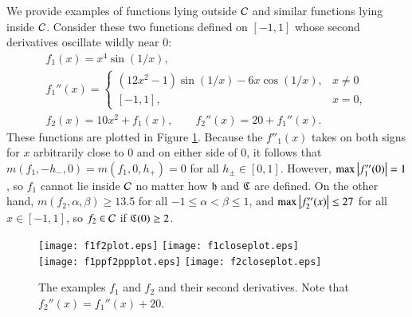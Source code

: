 \documentclass[review]{elsarticle}
\theoremstyle{definition}
\begin{document}
We provide examples of functions lying outside $\mathcal{C}$
and similar functions lying inside $\mathcal{C}$. Consider these two functions defined
on $[-1,1]$ whose second derivatives oscillate wildly near $0$:
\begin{gather*}
f_1(x) = x^4 \sin(1/x), \\
 f_1''(x) = \begin{cases} (12x^2 - 1) \sin(1/x) -6 x \cos(1/x), & x \ne 0 \\
 [-1,1], & x = 0, \end{cases} \\
f_2(x) = 10  x^2 + f_1(x), \qquad f_2''(x) = 20+ f_1''(x).
\end{gather*}
These functions are plotted in Figure \ref{f1f2fig}. Because the $f''_1(x)$
takes on both signs for $x$ arbitrarily close to $0$ and on either side of $0$,
it follows that  $m(f_1,-h_-,0) = m(f_1,0,h_+) = 0$ for all $h_\pm \in [0,1]$.
However, $\max\left \lvert f''_1(0) \right \rvert = 1$, so $f_1$ cannot lie inside
$\mathcal{C}$ no matter how $\mathfrak{h}$ and $\mathfrak{C}$ are defined. On the other hand,
$m(f_2,\alpha, \beta) \ge 13.5$ for all $-1 \le \alpha < \beta \le 1$, and
$\max \left \lvert f''_2(x) \right \rvert \le 27$ for all $x \in [-1,1]$, so $f_2 \in
\mathcal{C}$ if $\mathfrak{C}(0) \ge 2$.

\begin{figure}[t]
\centering
\texttt{[image: f1f2plot.eps]} \quad
\texttt{[image: f1closeplot.eps]} \\
\texttt{[image: f1ppf2ppplot.eps]} \quad
\texttt{[image: f2closeplot.eps]}
\caption{The examples $f_1$ and $f_2$ and their second derivatives. Note that
$f_2''(x) = f_1''(x) + 20$.}
\label{f1f2fig}
\end{figure}
\end{document}
